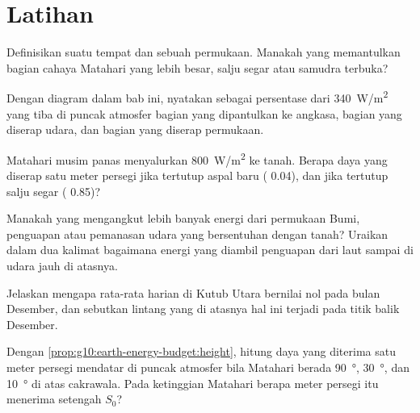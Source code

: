 \section{Latihan}

\begin{exercise}[$\star$]\label{exo:g10:earth-energy-budget:1}
Definisikan  suatu tempat dan  sebuah permukaan. Manakah yang
memantulkan bagian cahaya Matahari yang lebih besar, salju segar atau samudra
terbuka?
\end{exercise}

\begin{exercise}[$\star$]\label{exo:g10:earth-energy-budget:2}
Dengan diagram  dalam bab ini, nyatakan sebagai persentase dari
\qty{340}{W/m^2} yang tiba di puncak atmosfer bagian yang dipantulkan ke
angkasa, bagian yang diserap udara, dan bagian yang diserap permukaan.
\end{exercise}

\begin{exercise}[$\star$]\label{exo:g10:earth-energy-budget:3}
Matahari musim panas menyalurkan \qty{800}{W/m^2} ke tanah. Berapa daya yang
diserap satu meter persegi jika tertutup aspal baru ( 0.04), dan jika
tertutup salju segar ( 0.85)?
\end{exercise}

\begin{exercise}[$\star$]\label{exo:g10:earth-energy-budget:4}
Manakah yang mengangkut lebih banyak energi dari permukaan Bumi, penguapan
atau pemanasan udara yang bersentuhan dengan tanah? Uraikan dalam dua kalimat
bagaimana energi yang diambil penguapan dari laut sampai di udara jauh di
atasnya.
\end{exercise}

\begin{exercise}[$\star$]\label{exo:g10:earth-energy-budget:5}
Jelaskan mengapa  rata-rata harian di Kutub Utara bernilai nol pada
bulan Desember, dan sebutkan lintang yang di atasnya hal ini terjadi pada
titik balik Desember.
\end{exercise}

\begin{exercise}[$\star\star$]\label{exo:g10:earth-energy-budget:6}
Dengan \cref{prop:g10:earth-energy-budget:height}, hitung daya yang diterima
satu meter persegi mendatar di puncak atmosfer bila Matahari berada
\qty{90}{\degree}, \qty{30}{\degree}, dan \qty{10}{\degree} di atas
cakrawala. Pada ketinggian Matahari berapa meter persegi itu menerima setengah
$S_0$?
\end{exercise}

